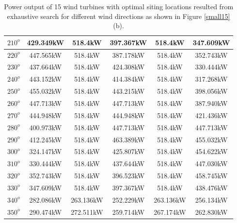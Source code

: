 \begin{table}[H]
\begin{tabular}{|c|c|c|c|c|c|}
		$210^o$	& 429.349kW	& 518.4kW	& 397.367kW	& 518.4kW	& 347.609kW	\\ \hline
		$220^o$	& 447.565kW	& 518.4kW	& 387.178kW	& 518.4kW	& 352.743kW	\\ \hline
		$230^o$	& 437.664kW	& 518.4kW	& 424.308kW	& 518.4kW	& 330.444kW	\\ \hline
		$240^o$	& 443.152kW	& 518.4kW	& 414.384kW	& 518.4kW	& 317.268kW	\\ \hline
		$250^o$	& 455.032kW	& 518.4kW	& 443.215kW	& 518.4kW	& 398.056kW	\\ \hline
		$260^o$	& 447.713kW	& 518.4kW	& 447.713kW	& 518.4kW	& 387.940kW	\\ \hline
		$270^o$	& 444.948kW	& 518.4kW	& 444.948kW	& 518.4kW	& 421.436kW	\\ \hline
		$280^o$	& 400.973kW	& 518.4kW	& 447.713kW	& 518.4kW	& 447.713kW	\\ \hline
		$290^o$	& 412.245kW	& 518.4kW	& 463.389kW	& 518.4kW	& 455.032kW	\\ \hline
		$300^o$	& 324.147kW	& 518.4kW	& 425.807kW	& 518.4kW	& 454.622kW	\\ \hline
		$310^o$	& 330.444kW	& 518.4kW	& 437.644kW	& 518.4kW	& 447.030kW	\\ \hline
		$320^o$	& 352.743kW	& 518.4kW	& 396.523kW	& 518.4kW	& 458.745kW	\\ \hline
		$330^o$	& 347.609kW	& 518.4kW	& 397.367kW	& 518.4kW	& 438.476kW	\\ \hline
		$340^o$	& 282.086kW	& 263.136kW	& 252.229kW	& 263.136kW	& 256.134kW	\\ \hline
		$350^o$	& 290.474kW	& 272.511kW	& 259.714kW	& 267.174kW	& 262.830kW	\\ \hline
        	\end{tabular}
        	\caption{Power output of 15 wind turbines with optimal siting locations resulted from exhaustive search for different wind directions as shown in Figure \ref{small15} (b).}
        	\label{table15b}
        \end{table}
